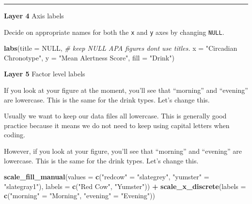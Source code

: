 \documentclass[
]{book}
\newenvironment{Shaded}{\begin{snugshade}}{\end{snugshade}}
\newcommand{\AttributeTok}[1]{\textcolor[rgb]{0.13,0.29,0.53}{#1}}
\newcommand{\CommentTok}[1]{\textcolor[rgb]{0.56,0.35,0.01}{\textit{#1}}}
\newcommand{\ConstantTok}[1]{\textcolor[rgb]{0.56,0.35,0.01}{#1}}
\newcommand{\FunctionTok}[1]{\textcolor[rgb]{0.13,0.29,0.53}{\textbf{#1}}}
\newcommand{\NormalTok}[1]{#1}
\newcommand{\OtherTok}[1]{\textcolor[rgb]{0.56,0.35,0.01}{#1}}
\newcommand{\SpecialCharTok}[1]{\textcolor[rgb]{0.81,0.36,0.00}{\textbf{#1}}}
\newcommand{\StringTok}[1]{\textcolor[rgb]{0.31,0.60,0.02}{#1}}
\begin{document}
\begin{center}\rule{0.5\linewidth}{0.5pt}\end{center}

\textbf{Layer 4} Axis labels

Decide on appropriate names for both the \texttt{x} and \texttt{y} axes by changing \texttt{NULL}.

\begin{Shaded}
\begin{Highlighting}[]
\FunctionTok{labs}\NormalTok{(}\AttributeTok{title =} \ConstantTok{NULL}\NormalTok{,   }\CommentTok{\# keep NULL APA figures don\textquotesingle{}t use titles.}
     \AttributeTok{x =} \StringTok{"Circadian Chronotype"}\NormalTok{,  }
     \AttributeTok{y =} \StringTok{"Mean Alertness Score"}\NormalTok{,}
     \AttributeTok{fill =} \StringTok{"Drink"}\NormalTok{)}
\end{Highlighting}
\end{Shaded}

\textbf{Layer 5} Factor level labels

If you look at your figure at the moment, you'll see that ``morning'' and ``evening'' are lowercase. This is the same for the drink types. Let's change this.

Usually we want to keep our data files all lowercase. This is generally good practice because it means we do not need to keep using capital letters when coding.

However, if you look at your figure, you'll see that ``morning'' and ``evening'' are lowercase. This is the same for the drink types. Let's change this.

\begin{Shaded}
\begin{Highlighting}[]
\FunctionTok{scale\_fill\_manual}\NormalTok{(}\AttributeTok{values =} \FunctionTok{c}\NormalTok{(}\StringTok{"redcow"} \OtherTok{=} \StringTok{"slategrey"}\NormalTok{, }\StringTok{"yumster"} \OtherTok{=} \StringTok{"slategray1"}\NormalTok{), }
                    \AttributeTok{labels =} \FunctionTok{c}\NormalTok{(}\StringTok{"Red Cow"}\NormalTok{, }\StringTok{"Yumster"}\NormalTok{)) }\SpecialCharTok{+}
  \FunctionTok{scale\_x\_discrete}\NormalTok{(}\AttributeTok{labels =} \FunctionTok{c}\NormalTok{(}\StringTok{"morning"} \OtherTok{=} \StringTok{"Morning"}\NormalTok{, }\StringTok{"evening"} \OtherTok{=} \StringTok{"Evening"}\NormalTok{))}
\end{Highlighting}
\end{Shaded}
\end{document}
